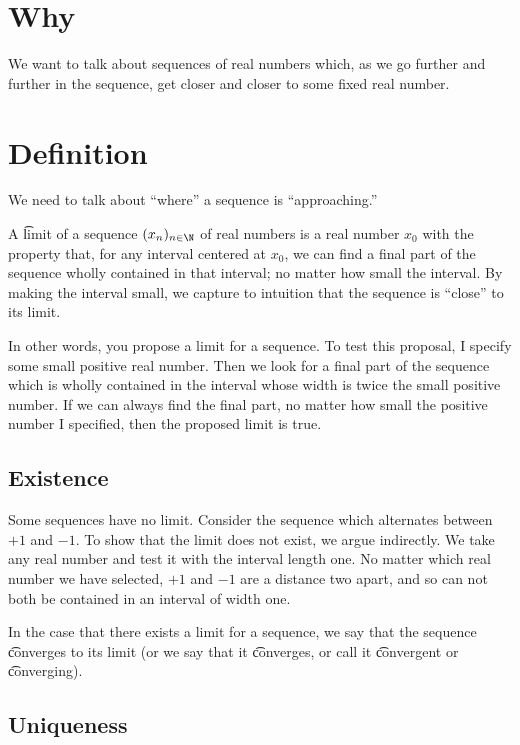 

\section*{Why}

We want to talk about sequences of real numbers which, as we go further and further in the sequence, get closer and closer to some fixed real number.

\section*{Definition}

We need to talk about ``where'' a sequence is ``approaching.''

A \t{limit} of a sequence $(x_n)_{n \in \N  }$ of real numbers is a real number $x_0$ with the property that, for any interval centered at $x_0$, we can find a final part of the sequence wholly contained in that interval; no matter how small the interval.
By making the interval small, we capture to intuition that the sequence is ``close'' to its limit.

In other words, you propose a limit for a sequence.
To test this proposal, I specify some small positive real number.
Then we look for a final part of the sequence which is wholly contained in the interval whose width is twice the small positive number.
If we can always find the final part, no matter how small the positive number I specified, then the proposed limit is true.

\subsection*{Existence}

Some sequences have no limit.
Consider the sequence which alternates between $+1$ and $-1$.
To show that the limit does not exist, we argue indirectly.
We take any real number and test it with the interval length one.
No matter which real number we have selected, $+1$ and $-1$ are a distance two apart, and so can not both be contained in an interval of width one.

In the case that there exists a limit for a sequence, we say that the sequence \t{converges to} its limit (or we say that it \t{converges}, or call it \t{convergent} or \t{converging}).

\subsection*{Uniqueness}

